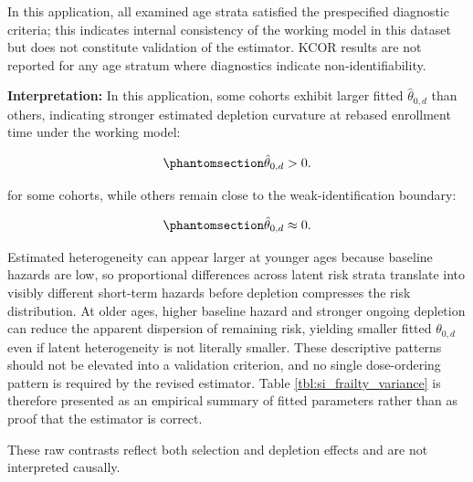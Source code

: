 \documentclass[
]{article}
\begin{document}
In this application, all examined age strata satisfied the prespecified
diagnostic criteria; this indicates internal consistency of the working
model in this dataset but does not constitute validation of the
estimator. KCOR results are not reported for any age stratum where
diagnostics indicate non-identifiability.

\textbf{Interpretation:} In this application, some cohorts exhibit
larger fitted \(\hat{\theta}_{0,d}\) than others, indicating stronger
estimated depletion curvature at rebased enrollment time under the
working model:

\begin{equation}\protect\phantomsection\label{eq:si_theta_positive}{
\hat{\theta}_{0,d} > 0.
}\end{equation}

for some cohorts, while others remain close to the weak-identification
boundary:

\begin{equation}\protect\phantomsection\label{eq:si_theta_near_zero_dose2}{
\hat{\theta}_{0,d} \approx 0.
}\end{equation}

Estimated heterogeneity can appear larger at younger ages because
baseline hazards are low, so proportional differences across latent risk
strata translate into visibly different short-term hazards before
depletion compresses the risk distribution. At older ages, higher
baseline hazard and stronger ongoing depletion can reduce the apparent
dispersion of remaining risk, yielding smaller fitted \(\theta_{0,d}\)
even if latent heterogeneity is not literally smaller. These descriptive
patterns should not be elevated into a validation criterion, and no
single dose-ordering pattern is required by the revised estimator. Table
\ref{tbl:si_frailty_variance} is therefore presented as an empirical
summary of fitted parameters rather than as proof that the estimator is
correct.

These raw contrasts reflect both selection and depletion effects and are
not interpreted causally.

\newpage
\end{document}
